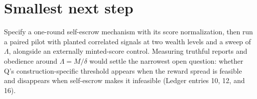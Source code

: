 \documentclass{article}
\begin{document}
\section*{Smallest next step}
Specify a one-round self-escrow mechanism with its score normalization, then run a paired pilot with planted correlated signals at two wealth levels and a sweep of $\Lambda$, alongside an externally minted-score control.  Measuring truthful reports and obedience around $\Lambda=M/\delta$ would settle the narrowest open question: whether Q's construction-specific threshold appears when the reward spread is feasible and disappears when self-escrow makes it infeasible (Ledger entries 10, 12, and 16).
\end{document}

